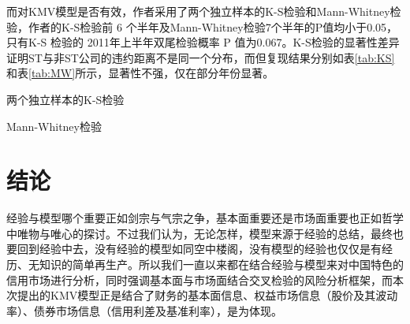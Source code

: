 \documentclass[a4paper,12pt]{ctexart}
\begin{document}
而对KMV模型是否有效，作者采用了两个独立样本的K-S检验和Mann-Whitney检验，作者的K-S检验前 6 个半年及Mann-Whitney检验7个半年的P值均小于0.05，只有K-S 检验的 2011年上半年双尾检验概率 P 值为0.067。K-S检验的显著性差异证明ST与非ST公司的违约距离不是同一个分布，而但复现结果分别如表\ref{tab:KS}和表\ref{tab:MW}所示，显著性不强，仅在部分年份显著。
\begin{table}[H]
    \centering
    
    \caption{两个独立样本的K-S检验}\label{tab:KS}
\end{table}
\begin{table}[H]
    \centering
    
    \caption{Mann-Whitney检验}\label{tab:MW}
\end{table}
\section*{结论}

经验与模型哪个重要正如剑宗与气宗之争，基本面重要还是市场面重要也正如哲学中唯物与唯心的探讨。不过我们认为，无论怎样，模型来源于经验的总结，最终也要回到经验中去，没有经验的模型如同空中楼阁，没有模型的经验也仅仅是有经历、无知识的简单再生产。所以我们一直以来都在结合经验与模型来对中国特色的信用市场进行分析，同时强调基本面与市场面结合交叉检验的风险分析框架，而本次提出的KMV模型正是结合了财务的基本面信息、权益市场信息（股价及其波动率）、债券市场信息（信用利差及基准利率），是为体现。
\nocite{*}
\appendix
\printbibliography%
\end{document}
